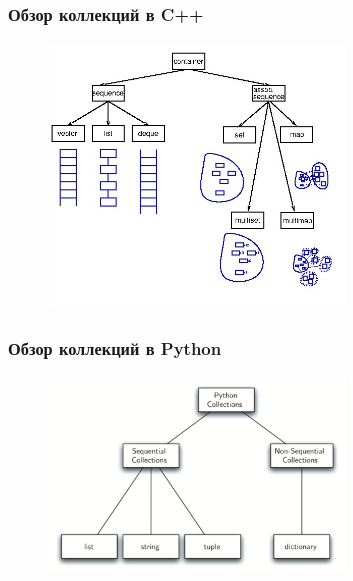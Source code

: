 \documentclass[default]{beamer}
\begin{document}
	\begin{frame}
		\frametitle{Обзор коллекций в C++}
		
		\begin{figure}
			\includegraphics[width=0.7\textwidth]{cont_cpp}
		\end{figure}
	\end{frame}
	
	\begin{frame}
	\frametitle{Обзор коллекций в Python}
	
	\begin{figure}
		\includegraphics[width=0.7\textwidth]{python-collections}
	\end{figure}
\end{frame}
	
\end{document}
